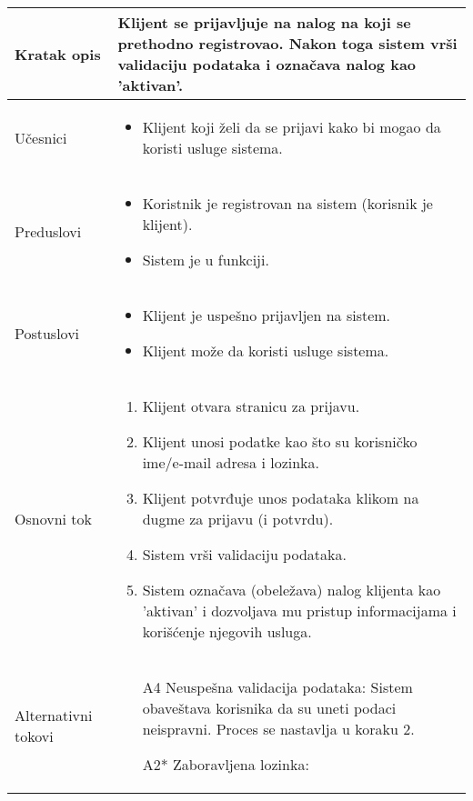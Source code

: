 \documentclass[../main.tex]{subfiles}
\begin{document}
\begin{longtable}{| p{} | p{} |} 
\hline
    Kratak opis & Klijent se prijavljuje na nalog na koji se prethodno registrovao. Nakon toga sistem vrši validaciju podataka i označava nalog kao 'aktivan'. \\
\hline
    Učesnici & \begin{itemize}
        \item Klijent koji želi da se prijavi kako bi mogao da koristi usluge sistema.
    \end{itemize} \\
\hline
   Preduslovi & \begin{itemize}
    \item Koristnik je registrovan na sistem (korisnik je klijent).
    \item Sistem je u funkciji.
   \end{itemize}
   \\
\hline  
    Postuslovi & \begin{itemize}
        \item Klijent je uspešno prijavljen na sistem.
        \item Klijent može da koristi usluge sistema.
    \end{itemize} \\
\hline
    Osnovni tok & \begin{enumerate}
    \item Klijent otvara stranicu za prijavu.
	\item Klijent unosi podatke kao što su korisničko ime/e-mail adresa i lozinka.
	\item Klijent potvrđuje unos podataka klikom na dugme za prijavu (i potvrdu).
	\item Sistem vrši validaciju podataka.
	\item Sistem označava (obeležava) nalog klijenta kao 'aktivan' i dozvoljava mu pristup informacijama i korišćenje njegovih usluga.
	\end{enumerate}\\
\hline
    Alternativni tokovi & \begin{itemize}
    \item [A4] Neuspešna validacija podataka: Sistem obaveštava korisnika da su uneti podaci neispravni. Proces se nastavlja u koraku 2.
    \item [A2*] Zaboravljena lozinka: \begin{enumerate}

\end{enumerate}
\end{itemize}
\end{longtable}
\end{document}
